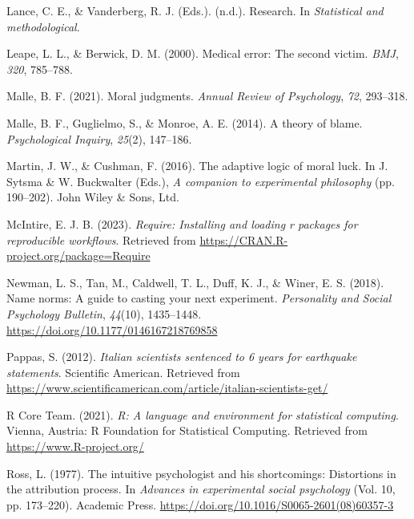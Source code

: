 \documentclass[
  man, donotrepeattitle,floatsintext]{apa6}
\newlength{\cslhangindent}
\newlength{\cslentryspacingunit} %
\newenvironment{CSLReferences}[2] %
 {%
  \setlength{\parindent}{0pt}
  \ifodd #1
  \let\oldpar\par
  \def\par{\hangindent=\cslhangindent\oldpar}
  \fi
  \setlength{\parskip}{#2\cslentryspacingunit}
 }%
 {}
\begin{document}
\begin{CSLReferences}{1}{0}
\leavevmode{}%
Lance, C. E., \& Vanderberg, R. J. (Eds.). (n.d.). Research. In \emph{Statistical and methodological}.

\leavevmode{}%
Leape, L. L., \& Berwick, D. M. (2000). Medical error: The second victim. \emph{BMJ}, \emph{320}, 785--788.

\leavevmode{}%
Malle, B. F. (2021). Moral judgments. \emph{Annual Review of Psychology}, \emph{72}, 293--318.

\leavevmode{}%
Malle, B. F., Guglielmo, S., \& Monroe, A. E. (2014). A theory of blame. \emph{Psychological Inquiry}, \emph{25}(2), 147--186.

\leavevmode{}%
Martin, J. W., \& Cushman, F. (2016). The adaptive logic of moral luck. In J. Sytsma \& W. Buckwalter (Eds.), \emph{A companion to experimental philosophy} (pp. 190--202). John Wiley \& Sons, Ltd.

\leavevmode{}%
McIntire, E. J. B. (2023). \emph{Require: Installing and loading r packages for reproducible workflows}. Retrieved from \url{https://CRAN.R-project.org/package=Require}

\leavevmode{}%
Newman, L. S., Tan, M., Caldwell, T. L., Duff, K. J., \& Winer, E. S. (2018). Name norms: A guide to casting your next experiment. \emph{Personality and Social Psychology Bulletin}, \emph{44}(10), 1435--1448. \url{https://doi.org/10.1177/0146167218769858}

\leavevmode{}%
Pappas, S. (2012). \emph{Italian scientists sentenced to 6 years for earthquake statements}. Scientific American. Retrieved from \url{https://www.scientificamerican.com/article/italian-scientists-get/}

\leavevmode{}%
R Core Team. (2021). \emph{R: A language and environment for statistical computing}. Vienna, Austria: R Foundation for Statistical Computing. Retrieved from \url{https://www.R-project.org/}

\leavevmode{}%
Ross, L. (1977). The intuitive psychologist and his shortcomings: Distortions in the attribution process. In \emph{Advances in experimental social psychology} (Vol. 10, pp. 173--220). Academic Press. \url{https://doi.org/10.1016/S0065-2601(08)60357-3}


\end{CSLReferences}
\end{document}
